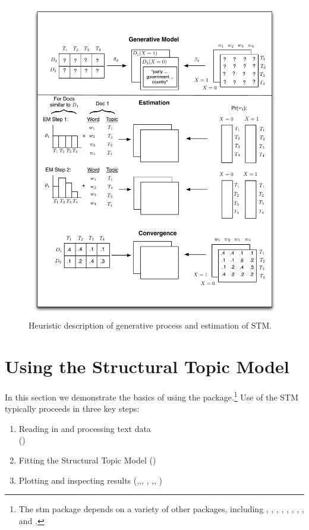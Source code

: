 \documentclass[nojss]{jss}
\begin{document}
\begin{figure}
  \centering
  \includegraphics[scale=.45]{STMdiagram.pdf}
  \caption{Heuristic description of generative process and estimation of STM.}\label{fig:stmoverview}
\end{figure}

\section{Using the Structural Topic Model}
\label{sec:use}

In this section we demonstrate the basics of using the package.\footnote{The stm package depends on a variety of other packages, including  \citep{MatrixStats},  \citep{slam},  \citep{lda},  \citep{stringr},  \citep{SnowballC},  \citep{meyer2008text},  \citep{igraph},  \citep{huge}, and  \citep{friedman2010regularization}.} Use of the STM typically proceeds in three key steps:

\begin{enumerate}
\item Reading in and processing text data \\
()
\item Fitting the Structural Topic Model
()
\item Plotting and inspecting results
(,,, , ,, )
\end{enumerate}
\end{document}
